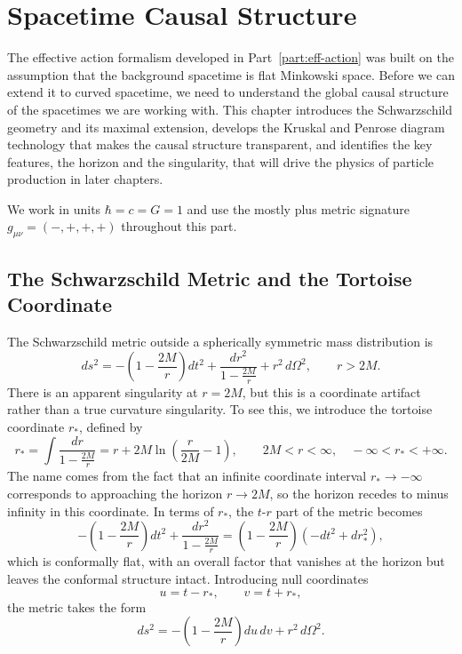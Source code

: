 \chapter{Spacetime Causal Structure}
\label{ch:causal-structure}
The effective action formalism developed in Part~\ref{part:eff-action}
was built on the assumption that the background spacetime is flat
Minkowski space. Before we can extend it to curved spacetime, we need
to understand the global causal structure of the spacetimes we are
working with. This chapter introduces the Schwarzschild geometry and
its maximal extension, develops the Kruskal and Penrose diagram
technology that makes the causal structure transparent, and identifies
the key features, the horizon and the singularity, that will drive the
physics of particle production in later chapters.

We work in units $\hbar = c = G = 1$ and use the mostly plus metric
signature $g_{\mu\nu} = (-,+,+,+)$ throughout this part.

\section{The Schwarzschild Metric and the Tortoise Coordinate}

The Schwarzschild metric outside a spherically symmetric mass
distribution is
\begin{equation}
	ds^2 = -\left(1-\frac{2M}{r}\right)dt^2
	+ \frac{dr^2}{1-\frac{2M}{r}}
	+ r^2\,d\Omega^2, \qquad r > 2M.
\end{equation}
There is an apparent singularity at $r = 2M$, but this is a coordinate
artifact rather than a true curvature singularity. To see this, we
introduce the tortoise coordinate $r_*$, defined by
\begin{equation}
	r_* = \int\frac{dr}{1-\frac{2M}{r}}
	= r + 2M\ln\!\left(\frac{r}{2M}-1\right),
	\qquad 2M < r < \infty,\quad
	-\infty < r_* < +\infty.
\end{equation}
The name comes from the fact that an infinite coordinate interval
$r_*\to-\infty$ corresponds to approaching the horizon $r\to 2M$,
so the horizon recedes to minus infinity in this coordinate. In terms
of $r_*$, the $t$-$r$ part of the metric becomes
\begin{equation}
	-\left(1-\frac{2M}{r}\right)dt^2
	+ \frac{dr^2}{1-\frac{2M}{r}}
	= \left(1-\frac{2M}{r}\right)(-dt^2 + dr_*^2),
\end{equation}
which is conformally flat, with an overall factor that vanishes at the
horizon but leaves the conformal structure intact. Introducing null
coordinates
\begin{equation}
	u = t - r_*, \qquad v = t + r_*,
\end{equation}
the metric takes the form
\begin{equation}
	ds^2 = -\left(1-\frac{2M}{r}\right)du\,dv + r^2\,d\Omega^2.
\end{equation}

